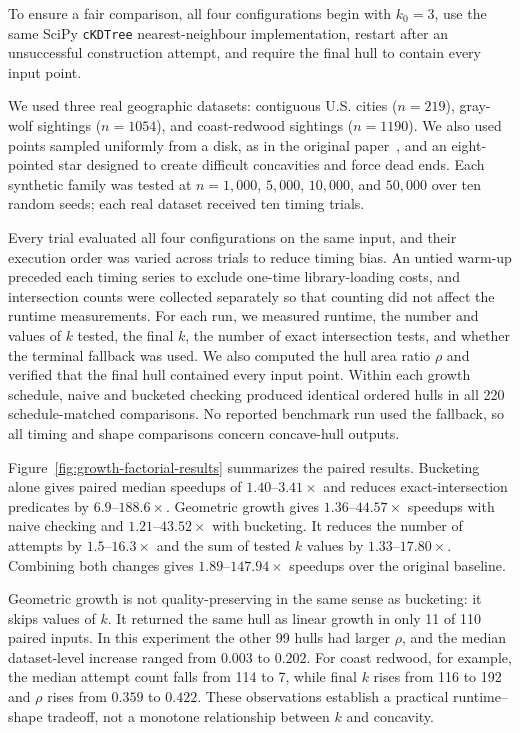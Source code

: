 \documentclass[a4paper,twoside]{article}
\begin{document}
To ensure a fair comparison, all four configurations begin with \(k_0=3\), use the same SciPy \texttt{cKDTree} nearest-neighbour implementation, restart after an unsuccessful construction attempt, and require the final hull to contain every input point.

We used three real geographic datasets: contiguous U.S. cities ($n=219$), gray-wolf
sightings ($n=1054$), and coast-redwood sightings ($n=1190$). We also used points
sampled uniformly from a disk, as in the original paper~\cite{moreira2007}, and an
eight-pointed star designed to create difficult concavities and force dead ends. Each
synthetic family was tested at $n=1{,}000$, $5{,}000$, $10{,}000$, and $50{,}000$
over ten random seeds; each real dataset received ten timing trials.

Every trial evaluated all four configurations on the same input, and their execution order was varied across trials to reduce timing bias. An untied warm-up preceded each timing series to exclude one-time library-loading costs, and intersection counts were collected separately so that counting did not affect the runtime measurements. For each run, we measured runtime, the number and values of \(k\) tested, the final \(k\), the number of exact intersection tests, and whether the terminal fallback was used. We also computed the hull area ratio \(\rho\) and verified that the final hull contained every input point. Within each growth schedule,
naive and bucketed checking produced identical ordered hulls in all 220
schedule-matched comparisons. No reported benchmark run used the fallback, so
all timing and shape comparisons concern concave-hull outputs.


Figure~\ref{fig:growth-factorial-results} summarizes the paired results. Bucketing alone gives paired
median speedups of $1.40$--$3.41\times$ and reduces exact-intersection predicates by
$6.9$--$188.6\times$. Geometric growth gives $1.36$--$44.57\times$ speedups with
naive checking and $1.21$--$43.52\times$ with bucketing. It reduces the number of
attempts by $1.5$--$16.3\times$ and the sum of tested $k$ values by
$1.33$--$17.80\times$. Combining both changes gives $1.89$--$147.94\times$ speedups
over the original baseline.

Geometric growth is not quality-preserving in the same sense as bucketing: it skips
values of $k$. It returned the same hull as linear growth in only 11 of 110 paired
inputs. In this experiment the other 99 hulls had larger $\rho$, and the median
dataset-level increase ranged from $0.003$ to $0.202$. For coast redwood, for example,
the median attempt count falls from 114 to 7, while final $k$ rises from 116 to 192
and $\rho$ rises from $0.359$ to $0.422$. These observations establish a practical
runtime--shape tradeoff, not a monotone relationship between $k$ and concavity.
\end{document}

